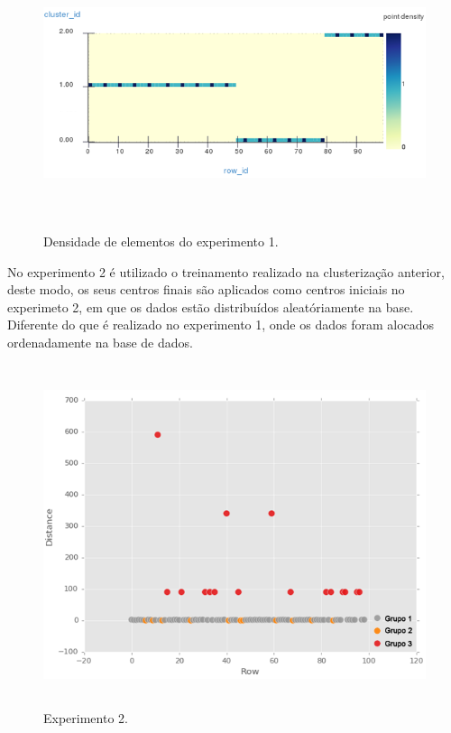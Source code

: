 \begin{figure}[!h]
\centering
\includegraphics[width = 14cm, height = 8cm]{figuras/densidade2.png}
\caption{\scriptsize{Densidade de elementos do experimento 1.}}
\end{figure}
  
\newpage

\indent No experimento 2 é utilizado o treinamento realizado na clusterização anterior, deste modo, os seus centros finais são aplicados como centros iniciais no experimeto 2, em que os dados estão distribuídos aleatóriamente na base. Diferente do que é realizado no experimento 1, onde os dados foram alocados ordenadamente na base de dados.

\begin{figure}[!h]
\centering
\includegraphics[width = 13cm, height = 10cm]{figuras/aleatorio1.png}
\caption{\scriptsize{Experimento 2.}}
\end{figure}

